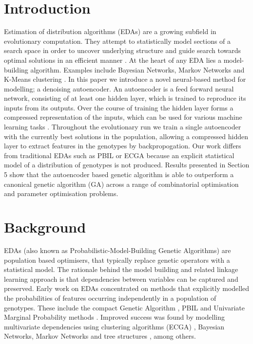 \documentclass[runningheads,a4paper]{llncs}
\begin{document}
\section{Introduction}

Estimation of distribution algorithms (EDAs) are a growing subfield in evolutionary computation. They attempt to statistically model sections of a search space in order to uncover underlying structure and guide search towards optimal solutions in an efficient manner \cite{pelikan2006scalable}. At the heart of any EDA lies a model-building algorithm. Examples include Bayesian Networks, Markov Networks and K-Means clustering \cite{pelikan2002survey}. In this paper we introduce a novel neural-based method for modelling; a denoising autoencoder. An autoencoder is a feed forward neural network, consisting of at least one hidden layer, which is trained to reproduce its inputs from its outputs. Over the course of training the hidden layer forms a compressed representation of the inputs, which can be used for various machine learning tasks \cite{hinton2006reducing}. Throughout the evolutionary run we train a single autoencoder with the currently best solutions in the population, allowing a compressed hidden layer to extract features in the genotypes by backpropogation. Our work differs from traditional EDAs such as PBIL \cite{baluja1994population} or ECGA \cite{harik1999linkage} because an explicit statistical model of a distribution of genotypes is not produced. Results presented in Section 5 show that the autoencoder based genetic algorithm is able to outperform a canonical genetic algorithm (GA) across a range of combinatorial optimisation and parameter optimisation problems.

\section{Background}

EDAs (also known as Probabilistic-Model-Building Genetic Algorithms) are population based optimisers, that typically replace genetic operators with a statistical model. The rationale behind the model building and related linkage learning approach is that dependencies between variables can be captured and preserved. Early work on EDAs concentrated on methods that explicitly modelled the probabilities of features occurring independently in a population of genotypes. These include the compact Genetic Algorithm \cite{harik1999compact}, PBIL \cite{baluja1994population} and Univariate Marginal Probability methods \cite{pelikan2002survey}. Improved success was found by modelling multivariate dependencies using clustering algorithms (ECGA) \cite{harik1999linkage}, Bayesian Networks, Markov Networks and tree structures \cite{pelikan2002survey}, among others.
\end{document}

